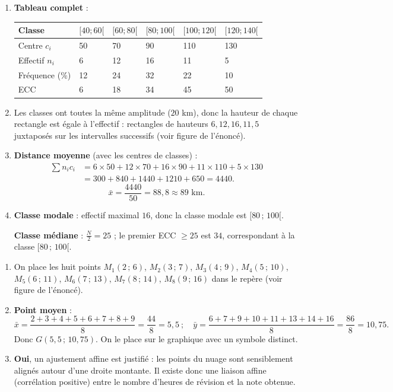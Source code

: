 \documentclass[11pt]{article}
\begin{document}
\begin{corrige}
\begin{enumerate}
    \item \textbf{Tableau complet} :
    \begin{center}
    \begin{tabularx}{\linewidth}{|l|X|X|X|X|X|}
    \hline
    \rowcolor{popblueL}
    Classe & $[40;60[$ & $[60;80[$ & $[80;100[$ & $[100;120[$ & $[120;140[$ \\
    \hline
    Centre $c_i$ & 50 & 70 & 90 & 110 & 130 \\
    \hline
    Effectif $n_i$ & 6 & 12 & 16 & 11 & 5 \\
    \hline
    Fréquence (\%) & 12 & 24 & 32 & 22 & 10 \\
    \hline
    ECC & 6 & 18 & 34 & 45 & 50 \\
    \hline
    \end{tabularx}
    \end{center}
    \item Les classes ont toutes la même amplitude ($20$ km), donc la hauteur de chaque rectangle est égale à l'effectif : rectangles de hauteurs $6, 12, 16, 11, 5$ juxtaposés sur les intervalles successifs (voir figure de l'énoncé).
    \item \textbf{Distance moyenne} (avec les centres de classes) :
    \begin{align*}
    \sum n_i c_i &= 6\times 50+12\times 70+16\times 90+11\times 110+5\times 130\\
    &= 300+840+1440+1210+650 = 4440.
    \end{align*}
    \[ \bar{x}=\frac{4440}{50}=88{,}8 \approx \boxed{89\text{ km}}. \]
    \item \textbf{Classe modale} : effectif maximal $16$, donc la classe modale est $\boxed{[80\,;\,100[}$.
    
    \textbf{Classe médiane} : $\frac{N}{2}=25$ ; le premier ECC $\ge 25$ est $34$, correspondant à la classe $\boxed{[80\,;\,100[}$.
\end{enumerate}
\end{corrige}

\begin{corrige}
\begin{enumerate}
    \item On place les huit points $M_1(2\,;\,6)$, $M_2(3\,;\,7)$, $M_3(4\,;\,9)$, $M_4(5\,;\,10)$, $M_5(6\,;\,11)$, $M_6(7\,;\,13)$, $M_7(8\,;\,14)$, $M_8(9\,;\,16)$ dans le repère (voir figure de l'énoncé).
    \item \textbf{Point moyen} :
    \[ \bar{x}=\frac{2+3+4+5+6+7+8+9}{8}=\frac{44}{8}=5{,}5 \ ;\quad \bar{y}=\frac{6+7+9+10+11+13+14+16}{8}=\frac{86}{8}=10{,}75. \]
    Donc $\boxed{G(5{,}5\,;\,10{,}75)}$. On le place sur le graphique avec un symbole distinct.
    \item \textbf{Oui}, un ajustement affine est justifié : les points du nuage sont sensiblement alignés autour d'une droite montante. Il existe donc une liaison affine (corrélation positive) entre le nombre d'heures de révision et la note obtenue.
\end{enumerate}
\end{corrige}
\end{document}

